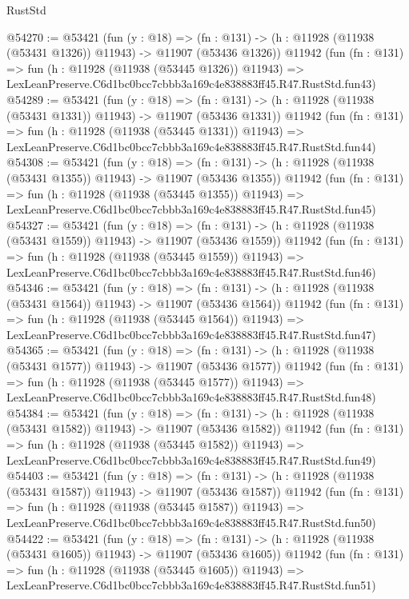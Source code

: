 \begin{lexlean}{RustStd}
\begin{coremodule}
@54270 := @53421
    (fun (y : @18) =>
    (fn : @131) -> (h : @11928 (@11938 (@53431 @1326)) @11943) -> @11907 (@53436 @1326))
    @11942
    (fun (fn : @131) =>
    fun (h : @11928 (@11938 (@53445 @1326)) @11943) =>
    LexLeanPreserve.C6d1bc0bcc7cbbb3a169c4e838883ff45.R47.RustStd.fun43)
@54289 := @53421
    (fun (y : @18) =>
    (fn : @131) -> (h : @11928 (@11938 (@53431 @1331)) @11943) -> @11907 (@53436 @1331))
    @11942
    (fun (fn : @131) =>
    fun (h : @11928 (@11938 (@53445 @1331)) @11943) =>
    LexLeanPreserve.C6d1bc0bcc7cbbb3a169c4e838883ff45.R47.RustStd.fun44)
@54308 := @53421
    (fun (y : @18) =>
    (fn : @131) -> (h : @11928 (@11938 (@53431 @1355)) @11943) -> @11907 (@53436 @1355))
    @11942
    (fun (fn : @131) =>
    fun (h : @11928 (@11938 (@53445 @1355)) @11943) =>
    LexLeanPreserve.C6d1bc0bcc7cbbb3a169c4e838883ff45.R47.RustStd.fun45)
@54327 := @53421
    (fun (y : @18) =>
    (fn : @131) -> (h : @11928 (@11938 (@53431 @1559)) @11943) -> @11907 (@53436 @1559))
    @11942
    (fun (fn : @131) =>
    fun (h : @11928 (@11938 (@53445 @1559)) @11943) =>
    LexLeanPreserve.C6d1bc0bcc7cbbb3a169c4e838883ff45.R47.RustStd.fun46)
@54346 := @53421
    (fun (y : @18) =>
    (fn : @131) -> (h : @11928 (@11938 (@53431 @1564)) @11943) -> @11907 (@53436 @1564))
    @11942
    (fun (fn : @131) =>
    fun (h : @11928 (@11938 (@53445 @1564)) @11943) =>
    LexLeanPreserve.C6d1bc0bcc7cbbb3a169c4e838883ff45.R47.RustStd.fun47)
@54365 := @53421
    (fun (y : @18) =>
    (fn : @131) -> (h : @11928 (@11938 (@53431 @1577)) @11943) -> @11907 (@53436 @1577))
    @11942
    (fun (fn : @131) =>
    fun (h : @11928 (@11938 (@53445 @1577)) @11943) =>
    LexLeanPreserve.C6d1bc0bcc7cbbb3a169c4e838883ff45.R47.RustStd.fun48)
@54384 := @53421
    (fun (y : @18) =>
    (fn : @131) -> (h : @11928 (@11938 (@53431 @1582)) @11943) -> @11907 (@53436 @1582))
    @11942
    (fun (fn : @131) =>
    fun (h : @11928 (@11938 (@53445 @1582)) @11943) =>
    LexLeanPreserve.C6d1bc0bcc7cbbb3a169c4e838883ff45.R47.RustStd.fun49)
@54403 := @53421
    (fun (y : @18) =>
    (fn : @131) -> (h : @11928 (@11938 (@53431 @1587)) @11943) -> @11907 (@53436 @1587))
    @11942
    (fun (fn : @131) =>
    fun (h : @11928 (@11938 (@53445 @1587)) @11943) =>
    LexLeanPreserve.C6d1bc0bcc7cbbb3a169c4e838883ff45.R47.RustStd.fun50)
@54422 := @53421
    (fun (y : @18) =>
    (fn : @131) -> (h : @11928 (@11938 (@53431 @1605)) @11943) -> @11907 (@53436 @1605))
    @11942
    (fun (fn : @131) =>
    fun (h : @11928 (@11938 (@53445 @1605)) @11943) =>
    LexLeanPreserve.C6d1bc0bcc7cbbb3a169c4e838883ff45.R47.RustStd.fun51)

\end{coremodule}
\end{lexlean}
